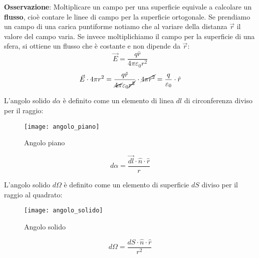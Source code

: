 \documentclass[a4paper]{article}
\begin{document}
\vspace{1em}
\noindent
\textbf{Osservazione}: Moltiplicare un campo per una superficie equivale a calcolare un
\textbf{flusso}, cioè contare le linee di campo per la superficie ortogonale. Se prendiamo
un campo di una carica puntiforme notiamo che al variare della distanza \( \vec{r} \) 
il valore del campo varia. Se invece moltiplichiamo il campo per la superficie di una 
sfera, si ottiene un flusso che è costante e non dipende da \( \vec{r} \):
\[
  \vec{E} = \frac{q \hat{r}}{4 \pi \varepsilon_0 r^2}
\] 
\[
  \vec{E} \cdot 4 \pi r^2 = \frac{q \hat{r}}{\cancel{4 \pi} \varepsilon_0 \cancel{r^2}}
  \cdot \cancel{4 \pi r^2} = \frac{q}{\varepsilon_0} \cdot \hat{r}
\] 

\begin{define}
  L'angolo solido \( d \alpha \) è definito come un elemento di linea \( dl \) di 
  circonferenza diviso per il raggio:
  \begin{figure}[H]
    \centering
    \texttt{[image: angolo\_piano]}
    \caption{Angolo piano}
  \end{figure}
  \[
    d \alpha = \frac{\vec{dl} \cdot \hat{n} \cdot \hat{r}}{r}
  \] 
\end{define}
\begin{define}
  L'angolo solido \( d \Omega \) è definito come un elemento di superficie \( dS \) diviso
  per il raggio al quadrato:
  \begin{figure}[H]
    \centering
    \texttt{[image: angolo\_solido]}
    \caption{Angolo solido}
  \end{figure}
  \[
    d \Omega = \frac{dS \cdot \hat{n} \cdot \hat{r}}{r^2}
  \]
  
\end{define}
\end{document}
